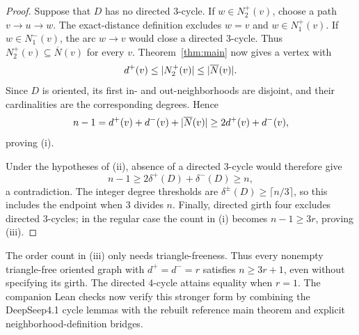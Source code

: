 \begin{proof}
Suppose that \(D\) has no directed \(3\)-cycle.  If \(w\in N_2^+(v)\),
choose a path \(v\to u\to w\).  The exact-distance definition excludes
\(w=v\) and \(w\in N_1^+(v)\).  If \(w\in N_1^-(v)\), the arc \(w\to v\)
would close a directed \(3\)-cycle.  Thus
\(N_2^+(v)\subseteq \overline N(v)\) for every \(v\).  Theorem~\ref{thm:main}
now gives a vertex with
\[
 d^+(v)\leq\lvert N_2^+(v)\rvert\leq\lvert \overline N(v)\rvert.
\]
Since \(D\) is oriented, its first in- and out-neighborhoods are disjoint,
and their cardinalities are the corresponding degrees.  Hence
\[
 n-1=d^+(v)+d^-(v)+\lvert \overline N(v)\rvert
 \geq 2d^+(v)+d^-(v),
\]
proving \textup{(i)}.

Under the hypotheses of \textup{(ii)}, absence of a directed \(3\)-cycle
would therefore give
\[
 n-1\geq2\delta^+(D)+\delta^-(D)\geq n,
\]
a contradiction.  The integer degree thresholds are
\(\delta^\pm(D)\geq\lceil n/3\rceil\), so this includes the endpoint
when \(3\) divides \(n\).  Finally, directed girth four excludes directed
\(3\)-cycles; in the regular case the count in \textup{(i)} becomes
\(n-1\geq3r\), proving \textup{(iii)}.
\end{proof}


\begin{remark}
The order count in \textup{(iii)} only needs triangle-freeness. Thus every
nonempty triangle-free oriented graph with $d^+=d^-=r$ satisfies
$n\ge3r+1$, even without specifying its girth. The directed $4$-cycle
attains equality when $r=1$. The companion Lean checks now verify this
stronger form by combining the DeepSeep4.1 cycle lemmas with the rebuilt
reference main theorem and explicit neighborhood-definition bridges.
\end{remark}
